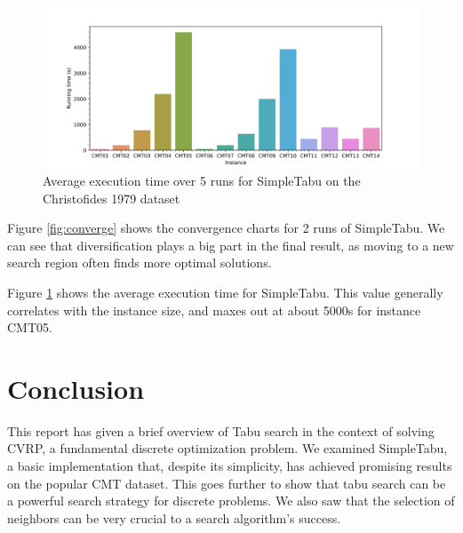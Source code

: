 \documentclass[12pt]{report}
\begin{document}
\begin{figure}[ht]
    \centering
    \includegraphics[height=0.3\textheight]{images/runtime_cmt.jpg}
    \caption{Average execution time over 5 runs for SimpleTabu on the Christofides 1979 dataset}
	\label{fig:time}
\end{figure}

Figure \ref{fig:converge} shows the convergence charts for 2 runs of SimpleTabu. We can see that diversification plays a big part in the final result, as moving to a new search region often finds more optimal solutions.

Figure \ref{fig:time} shows the average execution time for SimpleTabu. This value generally correlates with the instance size, and maxes out at about 5000s for instance CMT05.

\chapter{Conclusion}
This report has given a brief overview of Tabu search in the context of solving CVRP, a fundamental discrete optimization problem. We examined SimpleTabu, a basic implementation that, despite its simplicity, has achieved promising results on the popular CMT dataset. This goes further to show that tabu search can be a powerful search strategy for discrete problems. We also saw that the selection of neighbors can be very crucial to a search algorithm's success.



\end{document}
